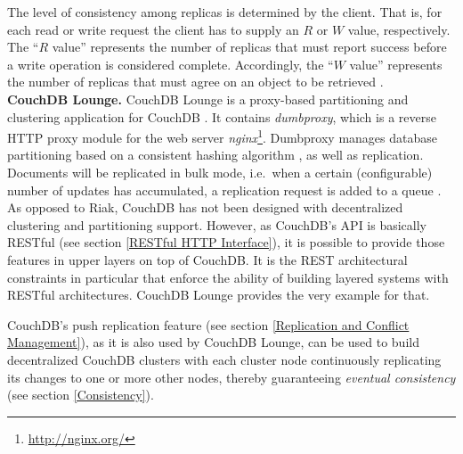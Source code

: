 The level of consistency among replicas is determined by the client. That is, for each read or write request the client has to supply an $R$ or $W$ value, respectively. The ``$R$ value'' represents the number of replicas that must report success before a write operation is considered complete. Accordingly, the ``$W$ value'' represents the number of replicas that must agree on an object to be retrieved \cite{Bas10a}.\\

\noindent
{\bf CouchDB Lounge.}
CouchDB Lounge is a proxy-based partitioning and clustering application for CouchDB \cite{Lou10a}. It contains \emph{dumbproxy}, which is a reverse HTTP proxy module for the web server \emph{nginx}\footnote{\url{http://nginx.org/}}. Dumbproxy manages database partitioning based on a consistent hashing algorithm \cite{Lou10b}, as well as replication. Documents will be replicated in bulk mode, i.e.\ when a certain (configurable) number of updates has accumulated, a replication request is added to a queue \cite{Lou10c}.\\

\noindent
As opposed to Riak, CouchDB has not been designed with decentralized clustering and partitioning support. However, as CouchDB's API is basically RESTful (see section \ref{RESTful HTTP Interface}), it is possible to provide those features in upper layers on top of CouchDB. It is the REST architectural constraints in particular that enforce the ability of building layered systems with RESTful architectures. CouchDB Lounge provides the very example for that.

CouchDB's push replication feature (see section \ref{Replication and Conflict Management}), as it is also used by CouchDB Lounge, can be used to build decentralized CouchDB clusters with each cluster node continuously replicating its changes to one or more other nodes, thereby guaranteeing \emph{eventual consistency} (see section \ref{Consistency}).
